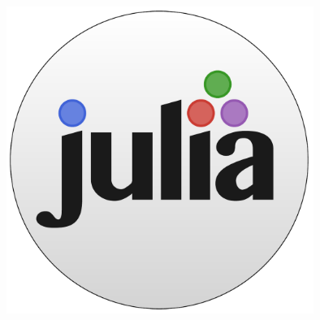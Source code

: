 \documentclass[a0,landscape]{a0poster}
\begin{document}
\begin{minipage}[b]{0.125\linewidth}
\includegraphics[width=10cm]{julia-logo-circular.pdf}\\
\end{minipage}

\vspace{1cm} %

\end{document}
